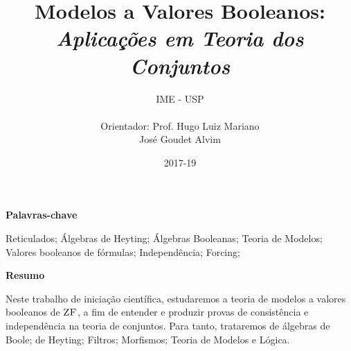 \documentclass[12pt]{report}
\title{{\textbf{Modelos a Valores Booleanos:}}\\\textit{Aplicações em Teoria dos Conjuntos}}
\author{
    {\LARGE IME - USP}\\\\
    {Orientador: Prof. Hugo Luiz Mariano}\\
                    José Goudet Alvim
}
\date{2017-19}
\begin{document}
    \usetikzlibrary{matrix}

    \maketitle
    \justify
    \begin{center}{\bf Palavras-chave}\end{center}
        Reticulados; Álgebras de Heyting; Álgebras Booleanas; 
        Teoria de Modelos; Valores booleanos de fórmulas; 
        Independência; Forcing;
    \begin{center}{\bf Resumo}\end{center}
        Neste trabalho de iniciação científica, estudaremos 
        a teoria de modelos a valores booleanos de $\text{\sc{ZF}}$, 
        a fim de entender e produzir provas de consistência 
        e independência na teoria de conjuntos. Para tanto, 
        trataremos de álgebras de Boole; de Heyting; Filtros; 
        Morfismos; Teoria de Modelos e Lógica.
    \cls
    
    \tableofcontents
    \cls
    
    
    
    
    
    
\end{document}
